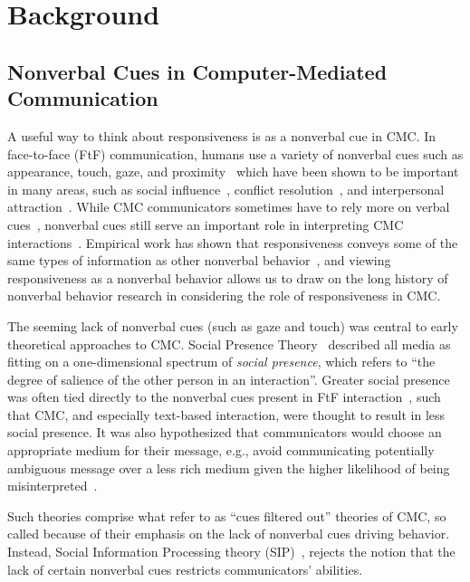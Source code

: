 \documentclass[12pt]{nuthesis}	%
\begin{document}
\chapter{Background}

\section{Nonverbal Cues in Computer-Mediated Communication}

A useful way to think about responsiveness is as a nonverbal cue in CMC. In face-to-face (FtF) communication, humans use a variety of nonverbal cues such as appearance, touch, gaze, and proximity~\citep{burgoon2016nonverbal} which have been shown to be important in many areas, such as social influence~\citep{hogg2006social}, conflict resolution~\citep{ting2001managing}, and interpersonal attraction~\citep{burgoon1991relational,erceau2007tactile}. While CMC communicators sometimes have to rely more on verbal cues~\citep{walther2005let}, nonverbal cues still serve an important role in interpreting CMC interactions~\citep{lo2008nonverbal,tidwell2002computer,walther1992interpersonal}. Empirical work has shown that responsiveness conveys some of the same types of information as other nonverbal behavior~\citep{kalman2013online}, and viewing responsiveness as a nonverbal behavior allows us to draw on the long history of nonverbal behavior research in considering the role of responsiveness in CMC.

The seeming lack of nonverbal cues (such as gaze and touch) was central to early theoretical approaches to CMC. Social Presence Theory~\citep{short1976social} described all media as fitting on a one-dimensional spectrum of \textit{social presence}, which refers to ``the degree of salience of the other person in an interaction''. Greater social presence was often tied directly to the nonverbal cues present in FtF interaction~\citep[e.g.,][]{burgoon1984relational}, such that CMC, and especially text-based interaction, were thought to result in less social presence. It was also hypothesized that communicators would choose an appropriate medium for their message, e.g., avoid communicating potentially ambiguous message over a less rich medium given the higher likelihood of being misinterpreted~\citep{daft1986organizational}.

Such theories comprise what \citet{walther2002cues} refer to as ``cues filtered out'' theories of CMC, so called because of their emphasis on the lack of nonverbal cues driving behavior. Instead, Social Information Processing theory (SIP)~\citep{walther1992interpersonal}, rejects the notion that the lack of certain nonverbal cues restricts communicators' abilities. 
\end{document}
